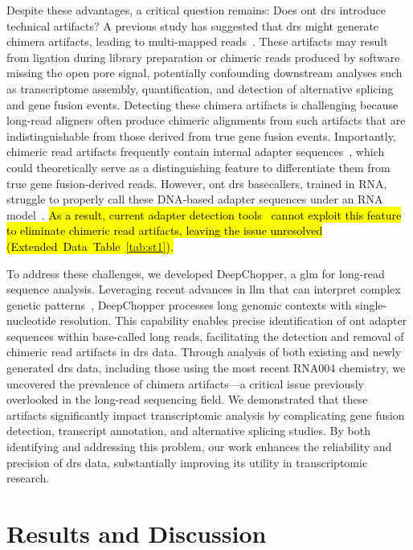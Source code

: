 \documentclass[pdflatex,sn-nature, lineno]{sn-jnl}%
\newcommand{\edtableref}[2]{Extended Data Table~\hyperref[#1]{\ref*{#1}#2}}
\begin{document}
Despite these advantages, a critical question remains: Does \gls{ont} \gls{drs} introduce technical artifacts?
A previous study has suggested that \gls{drs} might generate chimera artifacts, leading to multi-mapped reads~\cite{smith2020molecular}.
These artifacts may result from ligation during library preparation or chimeric reads produced by software missing the open pore signal, potentially confounding downstream analyses such as transcriptome assembly, quantification, and detection of alternative splicing and gene fusion events.
Detecting these chimera artifacts is challenging because long-read aligners often produce chimeric alignments from such artifacts that are indistinguishable from those derived from true gene fusion events.
Importantly, chimeric read artifacts frequently contain internal adapter sequences~\cite{smith2020molecular}, which could theoretically serve as a distinguishing feature to differentiate them from true gene fusion-derived reads.
However, \gls{ont} \gls{drs} basecallers, trained in RNA, struggle to properly call these DNA-based adapter sequences under an RNA model~\cite{liu2024sequencing}.
\hl{As a result, current adapter detection tools\mbox{~\cite{pychopper, Wick2017, bonenfant2023porechop}} cannot exploit this feature to eliminate chimeric read artifacts, leaving the issue unresolved (\mbox{\edtableref{tab:st1}{}}).}

To address these challenges, we developed DeepChopper, a \gls{glm} for long-read sequence analysis.
Leveraging recent advances in \gls{llm} that can interpret complex genetic patterns~\cite{benegas2024genomic}, DeepChopper processes long genomic contexts with single-nucleotide resolution.
This capability enables precise identification of \gls{ont} adapter sequences within base-called long reads, facilitating the detection and removal of chimeric read artifacts in \gls{drs} data.
Through analysis of both existing and newly generated \gls{drs} data, including those using the most recent RNA004 chemistry, we uncovered the prevalence of chimera artifacts—a critical issue previously overlooked in the long-read sequencing field.
We demonstrated that these artifacts significantly impact transcriptomic analysis by complicating gene fusion detection, transcript annotation, and alternative splicing studies.
By both identifying and addressing this problem, our work enhances the reliability and precision of \gls{drs} data, substantially improving its utility in transcriptomic research.

\section{Results and Discussion}
\end{document}
